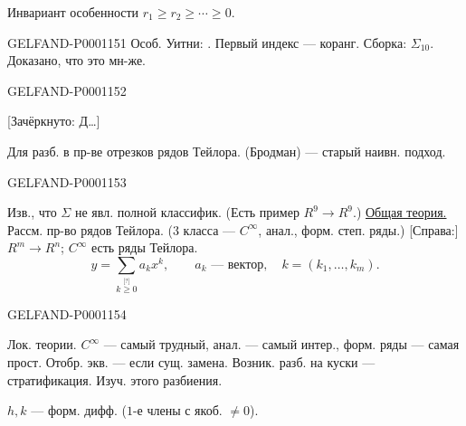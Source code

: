 Инвариант особенности $r_1\ge r_2\ge\cdots\ge0$.


\begin{GelfandAdjacentEvidence}{GELFAND-P000115}{1}
Особ. Уитни: .
Первый индекс — коранг.
Сборка: $\Sigma_{10}$. Доказано, что это мн-же.
\end{GelfandAdjacentEvidence}
\begin{GelfandAdjacentEvidence}{GELFAND-P000115}{2}

[Зачёркнуто: Д…]

Для разб. в пр-ве отрезков рядов Тейлора. (Бродман) —
старый наивн. подход.
\end{GelfandAdjacentEvidence}
\begin{GelfandAdjacentEvidence}{GELFAND-P000115}{3}


Изв., что $\Sigma$ не явл. полной классифик.
(Есть пример $R^9\longrightarrow R^9$.)
\underline{Общая теория.} Рассм. пр-во рядов Тейлора.
($3$ класса — $C^\infty$, анал., форм. степ. ряды.)
[Справа:] $R^m\longrightarrow R^n$; $C^\infty$ есть ряды Тейлора.
\begin{equation*}y=\sum_{k\mathrel{\overset{\text{[?]}}{\ge}}0}a_kx^k,\qquad a_k\text{ — вектор},\quad k=(k_1,\ldots,k_m).\end{equation*}
\end{GelfandAdjacentEvidence}
\begin{GelfandAdjacentEvidence}{GELFAND-P000115}{4}

Лок. теории.
$C^\infty$ — самый трудный, анал. — самый интер., форм. ряды —
самая прост.
Отобр. экв. — если сущ. замена.
Возник. разб. на куски — стратификация. Изуч. этого разбиения.
\begin{center}\end{center}

$h,k$ — форм. дифф. ($1$-е члены с якоб. $\ne0$).
\end{GelfandAdjacentEvidence}
